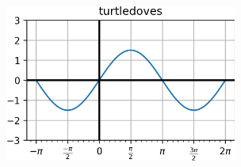 \documentclass{article}
\begin{document}
\begin{multicols}{2}
\includegraphics[width=3in]{turtledoves.png}
\end{multicols}
\end{document}
